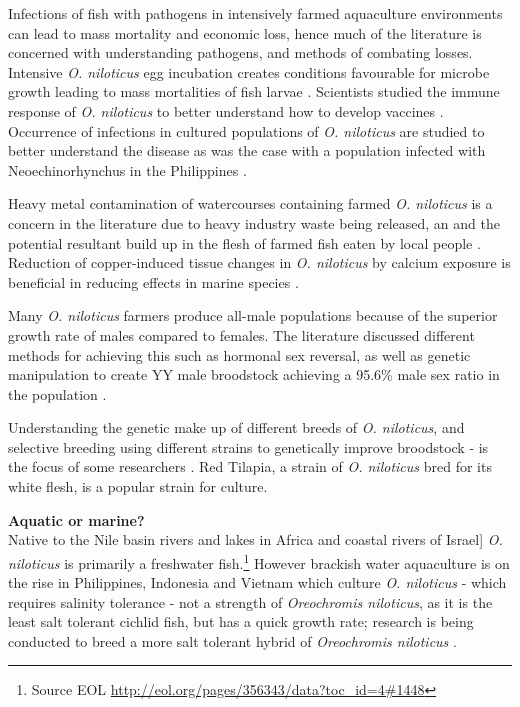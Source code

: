 \documentclass[]{book}
\let\rmarkdownfootnote\footnote%
\def\footnote{\protect\rmarkdownfootnote}
\theoremstyle{definition}
\theoremstyle{definition}
\theoremstyle{definition}
\theoremstyle{remark}
\begin{document}
Infections of fish with pathogens in intensively farmed aquaculture
environments can lead to mass mortality and economic loss, hence much of
the literature is concerned with understanding pathogens, and methods of
combating losses. Intensive \emph{O. niloticus} egg incubation creates
conditions favourable for microbe growth leading to mass mortalities of
fish larvae \citep{Jantrakajorn_2016}. Scientists studied the immune
response of \emph{O. niloticus} to better understand how to develop
vaccines \citep{Kuendee_2015}. Occurrence of infections in cultured
populations of \emph{O. niloticus} are studied to better understand the
disease as was the case with a population infected with
Neoechinorhynchus in the Philippines \citep{de_la_Cruz_2012}.

Heavy metal contamination of watercourses containing farmed \emph{O.
niloticus} is a concern in the literature due to heavy industry waste
being released, an and the potential resultant build up in the flesh of
farmed fish eaten by local people \citep{Baharom_2015, Marcussen_2007}.
Reduction of copper-induced tissue changes in \emph{O. niloticus} by
calcium exposure is beneficial in reducing effects in marine species
\citep{Kosai_2009}.

Many \emph{O. niloticus} farmers produce all-male populations because of
the superior growth rate of males compared to females. The literature
discussed different methods for achieving this such as hormonal sex
reversal, as well as genetic manipulation to create YY male broodstock
achieving a 95.6\% male sex ratio in the population
\citep{Guerrero_2008, Mair_1997}.

Understanding the genetic make up of different breeds of \emph{O.
niloticus}, and selective breeding using different strains to
genetically improve broodstock - is the focus of some researchers
\citep{Supiwong_2013, Bentsen_1998}. Red Tilapia, a strain of \emph{O.
niloticus} bred for its white flesh, is a popular strain for culture.

\textbf{Aquatic or marine?}\\
Native to the Nile basin rivers and lakes in Africa and coastal rivers
of Israel{]} \emph{O. niloticus} is primarily a freshwater
fish.\footnote{Source EOL
  \url{http://eol.org/pages/356343/data?toc_id=4\#1448}} However
brackish water aquaculture is on the rise in Philippines, Indonesia and
Vietnam which culture \emph{O. niloticus} - which requires salinity
tolerance - not a strength of \emph{Oreochromis niloticus}, as it is the
least salt tolerant cichlid fish, but has a quick growth rate; research
is being conducted to breed a more salt tolerant hybrid of
\emph{Oreochromis niloticus} \citep{Kamal_2005}.
\end{document}
